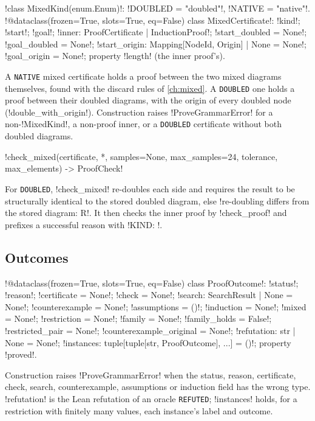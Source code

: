 \begin{signature}
\py!class MixedKind(enum.Enum)!: \py!DOUBLED = "doubled"!, \py!NATIVE = "native"!.\\
\py!@dataclass(frozen=True, slots=True, eq=False) class MixedCertificate!: \py!kind!; \py!start!; \py!goal!; \py!inner: ProofCertificate | InductionProof!; \py!start_doubled = None!; \py!goal_doubled = None!; \py!start_origin: Mapping[NodeId, Origin] | None = None!; \py!goal_origin = None!; property \py!length! (the inner proof's).
\end{signature}

A \texttt{NATIVE} mixed certificate holds a proof between the two mixed diagrams themselves, found with the discard rules of \cref{ch:mixed}. A \texttt{DOUBLED} one holds a proof between their doubled diagrams, with the origin of every doubled node (\py!double_with_origin!). Construction raises \py!ProveGrammarError! for a non-\py!MixedKind!, a non-proof inner, or a \texttt{DOUBLED} certificate without both doubled diagrams.

\begin{signature}
\py!check_mixed(certificate, *, samples=None, max_samples=24, tolerance, max_elements) -> ProofCheck!
\end{signature}
For \texttt{DOUBLED}, \py!check_mixed! re-doubles each side and requires the result to be structurally identical to the stored doubled diagram, else \code!re-doubling differs from the stored diagram: R!. It then checks the inner proof by \py!check_proof! and prefixes a successful reason with \code!KIND: !.

\subsection{Outcomes}

\begin{signature}
\py!@dataclass(frozen=True, slots=True, eq=False) class ProofOutcome!: \py!status!; \py!reason!; \py!certificate = None!; \py!check = None!; \py!search: SearchResult | None = None!; \py!counterexample = None!; \py!assumptions = ()!; \py!induction = None!; \py!mixed = None!; \py!restriction = None!; \py!family = None!; \py!family_holds = False!; \py!restricted_pair = None!; \py!counterexample_original = None!; \py!refutation: str | None = None!; \py!instances: tuple[tuple[str, ProofOutcome], ...] = ()!; property \py!proved!.
\end{signature}
Construction raises \py!ProveGrammarError! when the status, reason, certificate, check, search, counterexample, assumptions or induction field has the wrong type. \py!refutation! is the Lean refutation of an oracle \texttt{REFUTED}; \py!instances! holds, for a restriction with finitely many values, each instance's label and outcome.

